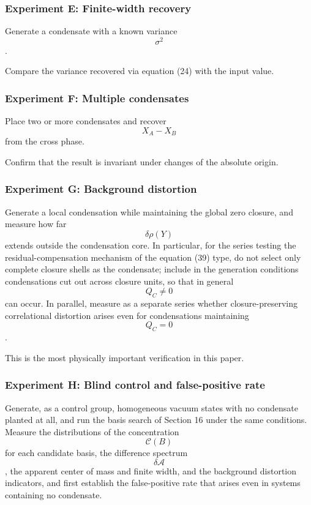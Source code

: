 \documentclass[
  a4paper,
]{article}
\begin{document}
\subsubsection{Experiment E: Finite-width
recovery}\label{experiment-e-finite-width-recovery}

Generate a condensate with a known variance \[\sigma^2\].

Compare the variance recovered via equation (24) with the input value.

\subsubsection{Experiment F: Multiple
condensates}\label{experiment-f-multiple-condensates}

Place two or more condensates and recover \[X_A-X_B\] from the cross
phase.

Confirm that the result is invariant under changes of the absolute
origin.

\subsubsection{Experiment G: Background
distortion}\label{experiment-g-background-distortion}

Generate a local condensation while maintaining the global zero closure,
and measure how far \[\delta\rho(Y)\] extends outside the condensation
core. In particular, for the series testing the residual-compensation
mechanism of the equation (39) type, do not select only complete closure
shells as the condensate; include in the generation conditions
condensations cut out across closure units, so that in general
\[Q_C\neq0\] can occur. In parallel, measure as a separate series
whether closure-preserving correlational distortion arises even for
condensations maintaining \[Q_C=0\].

This is the most physically important verification in this paper.

\subsubsection{Experiment H: Blind control and false-positive
rate}\label{experiment-h-blind-control-and-false-positive-rate}

Generate, as a control group, homogeneous vacuum states with no
condensate planted at all, and run the basis search of Section 16 under
the same conditions. Measure the distributions of the concentration
\[\mathcal C(B)\] for each candidate basis, the difference spectrum
\[\delta\mathcal A\], the apparent center of mass and finite width, and
the background distortion indicators, and first establish the
false-positive rate that arises even in systems containing no
condensate.
\end{document}
